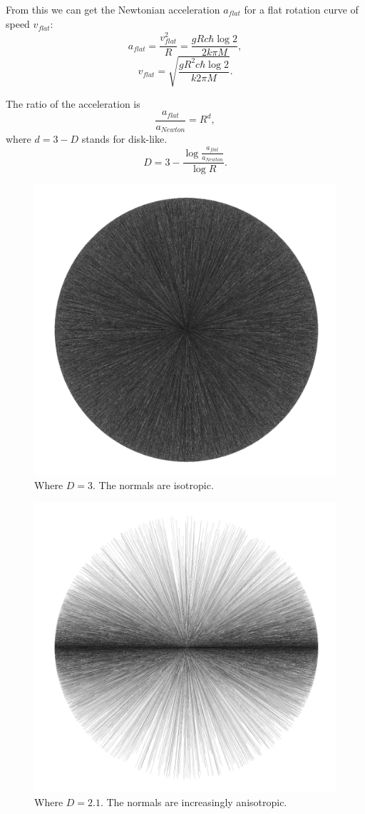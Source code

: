 \documentclass[12pt]{article}
\begin{document}
From this we can get the Newtonian acceleration $a_{\textit{flat}}$ for a flat rotation curve of speed $v_{\textit{flat}}$:
\begin{equation}
a_{\textit{flat}} = \frac{v_{\textit{flat}}^2}{R} = \frac{g R c \hbar \log 2}{2 k \pi M},
\end{equation}
\begin{equation}
v_{\textit{flat}} = \sqrt{\frac{g R^2 c \hbar \log 2}{k 2 \pi M}}.
\end{equation}

The ratio of the acceleration is
\begin{equation}
\frac{a_{\textit{flat}}}{a_{\textit{Newton}}} = R^{d}, 
\end{equation}
where $d = 3 - D$ stands for disk-like.
\begin{equation}
D = 3 - \frac{\log \frac{a_{\textit{flat}}}{a_{\textit{Newton}}}}{\log R}.
\end{equation}




\begin{figure} 
\centering
\label{fig1}
  \includegraphics[width = 3 in]{3.png}
  \caption{
Where $D = 3$.
The normals are isotropic.
}
\end{figure}

\begin{figure} 
\centering
\label{fig2}
  \includegraphics[width = 3 in]{2.1.png}
  \caption{
Where $D = 2.1$.
The normals are increasingly anisotropic.
}
\end{figure}
\end{document}
